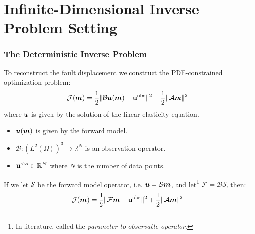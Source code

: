 \documentclass[
  pdf,
  10pt,
  xcolor={svgnames},
]{beamer}
\newcommand{\mc}[1]{\mathcal{#1}}
\newcommand{\R}{\mathbb{R}}
\renewcommand{\vec}[1]{{\mathchoice
                     {\mbox{\boldmath$\displaystyle{#1}$}}
                     {\mbox{\boldmath$\textstyle{#1}$}}
                     {\mbox{\boldmath$\scriptstyle{#1}$}}
                     {\mbox{\boldmath$\scriptscriptstyle{#1}$}}}}
\newcommand{\obs}{\mathbf{u}^{\rm obs}}
\begin{document}
\section{Infinite-Dimensional Inverse Problem Setting}
\begin{frame}
  \frametitle{The Deterministic Inverse Problem}
  To reconstruct the fault displacement we construct the PDE-constrained
  optimization problem:
  \[
    \mc{J}(\vec{m})
    = \frac{1}{2} \| \mc{B}\vec{u}(\vec{m}) - \obs \|^2
    + \frac{1}{2} \| \mc{A}\vec{m} \|^2
  \]
  where $\vec{u}$ is given by the solution of the linear elasticity equation.
  \begin{itemize}
    \item $\vec{u}(\vec{m})$ is given by the forward model.
    \item $\mc{B}: (L^2(\Omega))^3 \to \R^N$ is an observation operator.
    \item $\obs \in \R^N$ where $N$ is the number of data points.
  \end{itemize}
  \pause
  If we let $\mc{S}$ be the forward model operator, i.e. $\vec{u} = \mc{S}
  \vec{m}$, and let\footnote{%
    In literature, called the {\em parameter-to-observable operator}.
  } $\mc{F} = \mc{B} \mc{S}$, then:
  \[
    \mc{J}(\vec{m})
    = \frac{1}{2} \| \mc{F}\vec{m} - \obs \|^2
    + \frac{1}{2} \| \mc{A}\vec{m} \|^2
  \]
\end{frame}
\end{document}
